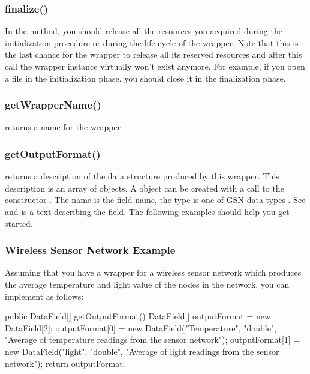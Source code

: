 \subsubsection {finalize()}
In the  method, you should release all the resources
you acquired during the initialization procedure or during the life cycle of the
wrapper. Note that this is the last chance for the wrapper to release all its
reserved resources and after this call the wrapper instance virtually won't exist
anymore.
For example, if you open a file in the initialization phase, you should close
it in the finalization phase.

\subsubsection {getWrapperName()}
 returns a name for the wrapper.

\subsubsection {getOutputFormat()}
 returns a description of
the data structure produced by this wrapper.
This description is an array of  objects. A  object
can be created with a call to the constructor . The name is the field name, the type
is one of GSN data types . See  and
 is a text describing the field.
The following examples should help you get started.

\subsubsection {Wireless Sensor Network Example}
Assuming that you have a wrapper for a wireless sensor network which produces
the average temperature and light value of the nodes in the network, you can
implement  as follows:

\begin{javacode}
	public DataField[] getOutputFormat() {
		DataField[] outputFormat = new DataField[2];
		outputFormat[0] = new DataField("Temperature", "double",
			"Average of temperature readings from the sensor network");
		outputFormat[1] = new DataField("light", "double",
			"Average of light readings from the sensor network");
		return outputFormat;
	}
\end{javacode}

